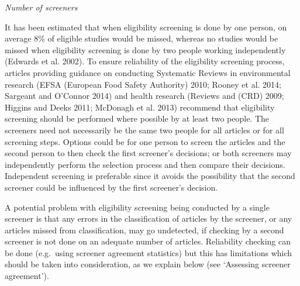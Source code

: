 \documentclass[
  letterpaper,
  DIV=11,
  numbers=noendperiod]{scrreprt}
\begin{document}
\emph{Number of screeners}

It has been estimated that when eligibility screening is done by one
person, on average 8\% of eligible studies would be missed, whereas no
studies would be missed when eligibility screening is done by two people
working independently (Edwards et al. 2002). To ensure reliability of
the eligibility screening process, articles providing guidance on
conducting Systematic Reviews in environmental research (EFSA (European
Food Safety Authority) 2010; Rooney et al. 2014; Sargeant and O'Connor
2014) and health research (Reviews and (CRD) 2009; Higgins and Deeks
2011; McDonagh et al. 2013) recommend that eligibility screening should
be performed where possible by at least two people. The screeners need
not necessarily be the same two people for all articles or for all
screening steps. Options could be for one person to screen the articles
and the second person to then check the first screener's decisions; or
both screeners may independently perform the selection process and then
compare their decisions. Independent screening is preferable since it
avoids the possibility that the second screener could be influenced by
the first screener's decision.

A potential problem with eligibility screening being conducted by a
single screener is that any errors in the classification of articles by
the screener, or any articles missed from classification, may go
undetected, if checking by a second screener is not done on an adequate
number of articles. Reliability checking can be done (e.g.~using
screener agreement statistics) but this has limitations which should be
taken into consideration, as we explain below (see `Assessing screener
agreement').
\end{document}
